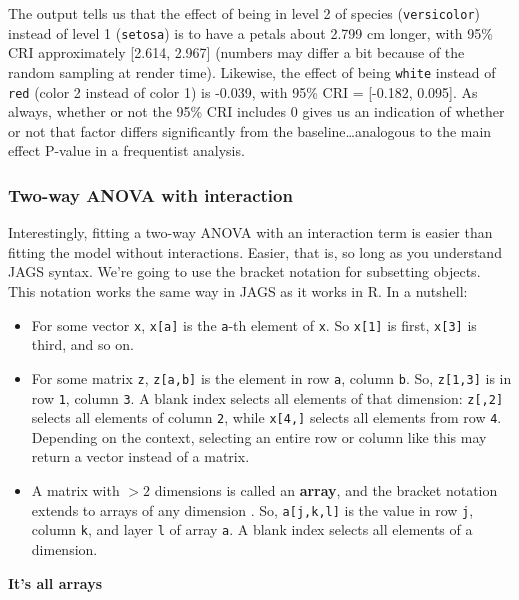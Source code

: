 \documentclass[
  13,
  letterpaper,
]{report}
\providecommand{\tightlist}{%
  \setlength{\itemsep}{0pt}\setlength{\parskip}{0pt}}
\begin{document}
The output tells us that the effect of being in level 2 of species
(\texttt{versicolor}) instead of level 1 (\texttt{setosa}) is to have a
petals about 2.799 cm longer, with 95\% CRI approximately {[}2.614,
2.967{]} (numbers may differ a bit because of the random sampling at
render time). Likewise, the effect of being \texttt{white} instead of
\texttt{red} (color 2 instead of color 1) is -0.039, with 95\% CRI =
{[}-0.182, 0.095{]}. As always, whether or not the 95\% CRI includes 0
gives us an indication of whether or not that factor differs
significantly from the baseline\ldots analogous to the main effect
P-value in a frequentist analysis.

\subsubsection{Two-way ANOVA with
interaction}\label{two-way-anova-with-interaction}

Interestingly, fitting a two-way ANOVA with an interaction term is
easier than fitting the model without interactions. Easier, that is, so
long as you understand JAGS syntax. We're going to use the bracket
notation for subsetting objects. This notation works the same way in
JAGS as it works in R. In a nutshell:

\begin{itemize}
\tightlist
\item
  For some vector \texttt{x}, \texttt{x{[}a{]}} is the \texttt{a}-th
  element of \texttt{x}. So \texttt{x{[}1{]}} is first,
  \texttt{x{[}3{]}} is third, and so on.
\item
  For some matrix \texttt{z}, \texttt{z{[}a,b{]}} is the element in row
  \texttt{a}, column \texttt{b}. So, \texttt{z{[}1,3{]}} is in row
  \texttt{1}, column \texttt{3}. A blank index selects all elements of
  that dimension: \texttt{z{[},2{]}} selects all elements of column
  \texttt{2}, while \texttt{x{[}4,{]}} selects all elements from row
  \texttt{4}. Depending on the context, selecting an entire row or
  column like this may return a vector instead of a matrix.
\item
  A matrix with \(>2\) dimensions is called an \textbf{array}, and the
  bracket notation extends to arrays of any dimension . So,
  \texttt{a{[}j,k,l{]}} is the value in row \texttt{j}, column
  \texttt{k}, and layer \texttt{l} of array \texttt{a}. A blank index
  selects all elements of a dimension.
\end{itemize}

\textbf{It's all arrays}
\end{document}
